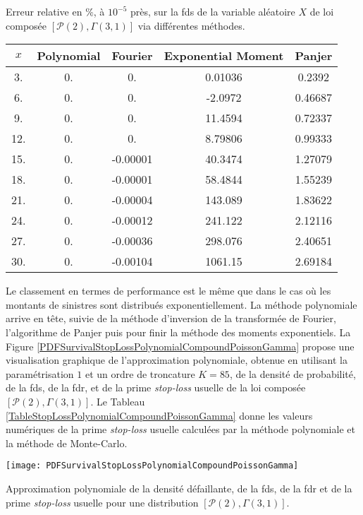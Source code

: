	\begin{tableth}
		\caption[Erreur relative ($\%$) liée à l\rq{}approximation de la \gls{fds} d'une loi $\left(\mathcal{P}(2),\Gamma(3,1)\right)$]{Erreur relative en $\%$, à $10^{-5}$ près, sur la \gls{fds} de la variable aléatoire $X$ de loi composée $\left[\mathcal{P}(2),\Gamma(3,1)\right]$ via différentes méthodes.}
			\label{TableRelativeErrorSurvivalPolynomialCompoundPoissonGammaDifferentMethod}
		\begin{tabular}{|c||c|c|c|c|}
\hline
$x$ & Polynomial&Fourier & Exponential Moment &Panjer \\
\hline
\hline
3. & 0. & 0. & 0.01036 & 0.2392 \\
 6. & 0. & 0. & -2.0972 & 0.46687 \\
 9. & 0. & 0. & 11.4594 & 0.72337 \\
 12. & 0. & 0. & 8.79806 & 0.99333 \\
 15. & 0. & -0.00001 & 40.3474 & 1.27079 \\
 18. & 0. & -0.00001 & 58.4844 & 1.55239 \\
 21. & 0. & -0.00004 & 143.089 & 1.83622 \\
 24. & 0. & -0.00012 & 241.122 & 2.12116 \\
 27. & 0. & -0.00036 & 298.076 & 2.40651 \\
 30. & 0. & -0.00104 & 1061.15 & 2.69184 \\
\hline
		\end{tabular}
	\end{tableth}
Le classement en termes de performance est le même que dans le cas où les montants de sinistres sont distribués exponentiellement. La méthode polynomiale arrive en tête, suivie de la méthode d\rq{}inversion de la transformée de Fourier, l\rq{}algorithme de Panjer puis pour finir la méthode des moments exponentiels. La Figure \ref{PDFSurvivalStopLossPolynomialCompoundPoissonGamma} propose une visualisation graphique de l\rq{}approximation polynomiale, obtenue en utilisant la paramétrisation $1$ et un ordre de troncature $K=85$, de la densité de probabilité, de la \gls{fds}, de la \gls{fdr}, et de la prime \textit{stop-loss} usuelle de la loi composée $\left[\mathcal{P}(2),\Gamma(3,1)\right]$. Le Tableau \ref{TableStopLossPolynomialCompoundPoissonGamma} donne les valeurs numériques de la prime \textit{stop-loss} usuelle calculées par la méthode polynomiale et la méthode de Monte-Carlo. 
\begin{figureth}
\texttt{[image: PDFSurvivalStopLossPolynomialCompoundPoissonGamma]}
\caption{Approximation polynomiale de la densité défaillante, de la \gls{fds}, de la \gls{fdr} et de la prime \textit{stop-loss} usuelle pour une distribution $\left[\mathcal{P}(2),\Gamma(3,1)\right]$.}		
\label{PDFSurvivalStopLossPolynomialCompoundPoissonGamma}
\end{figureth}

